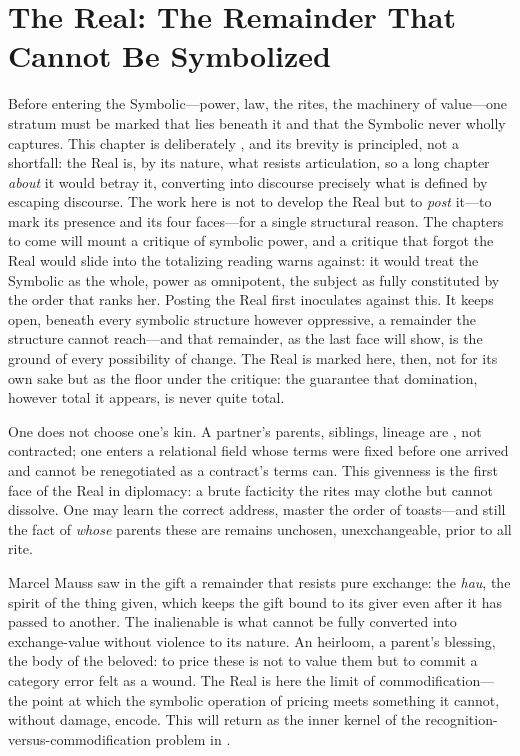 \section{The Real: The Remainder That Cannot Be Symbolized}\label{p07:sec:real}

Before entering the Symbolic---power, law, the rites, the machinery of value---one stratum must be marked that lies beneath it and that the Symbolic never wholly captures. This chapter is deliberately , and its brevity is principled, not a shortfall: the Real is, by its nature, what resists articulation, so a long chapter \emph{about} it would betray it, converting into discourse precisely what is defined by escaping discourse. The work here is not to develop the Real but to \emph{post} it---to mark its presence and its four faces---for a single structural reason. The chapters to come will mount a critique of symbolic power, and a critique that forgot the Real would slide into the totalizing reading  warns against: it would treat the Symbolic as the whole, power as omnipotent, the subject as fully constituted by the order that ranks her. Posting the Real first inoculates against this. It keeps open, beneath every symbolic structure however oppressive, a remainder the structure cannot reach---and that remainder, as the last face will show, is the ground of every possibility of change. The Real is marked here, then, not for its own sake but as the floor under the critique: the guarantee that domination, however total it appears, is never quite total.

 One does not choose one's kin. A partner's parents, siblings, lineage are , not contracted; one enters a relational field whose terms were fixed before one arrived and cannot be renegotiated as a contract's terms can. This givenness is the first face of the Real in diplomacy: a brute facticity the rites may clothe but cannot dissolve. One may learn the correct address, master the order of toasts---and still the fact of \emph{whose} parents these are remains unchosen, unexchangeable, prior to all rite.

 Marcel Mauss saw in the gift a remainder that resists pure exchange: the \emph{hau}, the spirit of the thing given, which keeps the gift bound to its giver even after it has passed to another. The inalienable is what cannot be fully converted into exchange-value without violence to its nature. An heirloom, a parent's blessing, the body of the beloved: to price these is not to value them but to commit a category error felt as a wound. The Real is here the limit of commodification---the point at which the symbolic operation of pricing meets something it cannot, without damage, encode. This will return as the inner kernel of the recognition-versus-commodification problem in .

